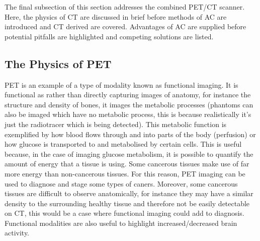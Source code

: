         The final subsection of this section addresses the combined \gls{PET}/\gls{CT} scanner. Here, the physics of \gls{CT} are discussed in brief before methods of \gls{AC} are introduced and \gls{CT} derived  are covered. Advantages of \gls{AC} are supplied before potential pitfalls are highlighted and competing solutions are listed.
        
        \subsection{The Physics of PET} \label{sec:the_physics_of_pet}
            
            \gls{PET} is an example of a type of modality known as functional imaging. It is functional as rather than directly capturing images of anatomy, for instance the structure and density of bones, it images the metabolic processes (phantoms can also be imaged which have no metabolic process, this is because realistically it's just the radiotracer which is being detected). This metabolic function is exemplified by how blood flows through and into parts of the body (perfusion) or how glucose is transported to and metabolised by certain cells. This is useful because, in the case of imaging glucose metabolism, it is possible to quantify the amount of energy that a tissue is using. Some cancerous tissues make use of far more energy than non-cancerous tissues. For this reason, PET imaging can be used to diagnose and stage some types of caners. Moreover, some cancerous tissues are difficult to observe anatomically, for instance they may have a similar density to the surrounding healthy tissue and therefore not be easily detectable on \gls{CT}, this would be a case where functional imaging could add to diagnosis. Functional modalities are also useful to highlight increased/decreased brain activity.
            
